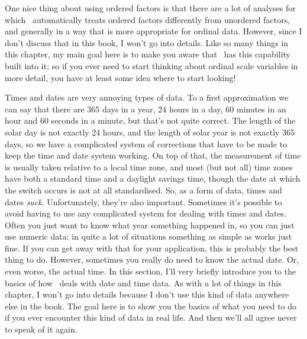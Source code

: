 One nice thing about using ordered factors is that there are a lot of analyses for which \R\ automatically treats ordered factors differently from unordered factors, and generally in a way that is more appropriate for ordinal data. However, since I don't discuss that in this book, I won't go into details. Like so many things in this chapter, my main goal here is to make you aware that \R\ has this capability built into it; so if you ever need to start thinking about ordinal scale variables in more detail, you have at least some idea where to start looking!





Times and dates are very annoying types of data. To a first approximation we can say that there are 365 days in a year, 24 hours in a day, 60 minutes in an hour and 60 seconds in a minute, but that's not quite correct. The length of the solar day is not exactly 24 hours, and the length of solar year is not exactly 365 days, so we have a complicated system of corrections that have to be made to keep the time and date system working. On top of that, the measurement of time is usually taken relative to a local time zone, and most (but not all) time zones have both a standard time and a daylight savings time, though the date at which the switch occurs is not at all standardised. So, as a form of data, times and dates {\it suck}. Unfortunately, they're also important. Sometimes it's possible to avoid having to use any complicated system for dealing with times and dates. Often you just want to know what year something happened in, so you can just use numeric data: in quite a lot of situations something as simple as  works just fine. If you can get away with that for your application, this is probably the best thing to do. However, sometimes you really do need to know the actual date. Or, even worse, the actual time. In this section, I'll very briefly introduce you to the basics of how \R\ deals with date and time data. As with a lot of things in this chapter, I won't go into details because I don't use this kind of data anywhere else in the book. The goal here is to show you the basics of what you need to do if you ever encounter this kind of data in real life. And then we'll all agree never to speak of it again.

